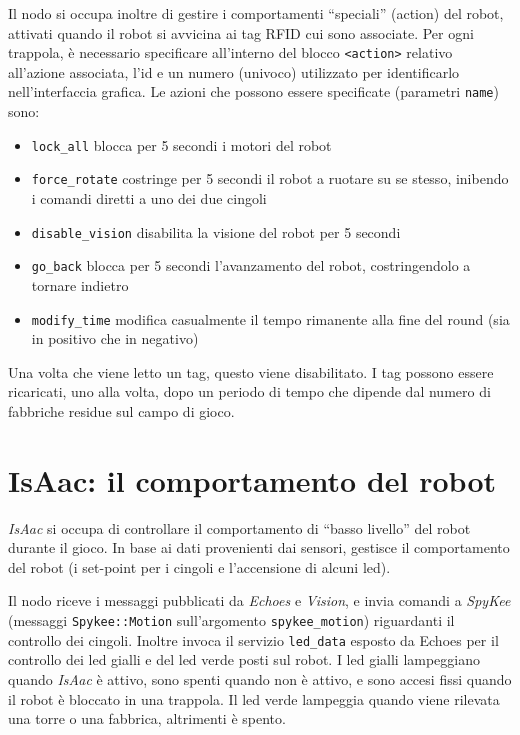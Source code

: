 Il nodo si occupa inoltre di gestire i comportamenti ``speciali'' (action) del robot, attivati quando il robot si avvicina ai tag RFID cui sono associate. Per ogni trappola, è necessario specificare all'interno del blocco \lstinline|<action>| relativo all'azione associata, l'id e un numero (univoco) utilizzato per identificarlo nell'interfaccia grafica. Le azioni che possono essere specificate (parametri \lstinline|name|) sono:
\begin{itemize}
\item \lstinline|lock_all| blocca per 5 secondi i motori del robot
\item \lstinline|force_rotate| costringe per 5 secondi il robot a ruotare su se stesso, inibendo i comandi diretti a uno dei due cingoli
\item \lstinline|disable_vision| disabilita la visione del robot per 5 secondi
\item \lstinline|go_back| blocca per 5 secondi l'avanzamento del robot, costringendolo a tornare indietro
\item \lstinline|modify_time| modifica casualmente il tempo rimanente alla fine del round (sia in positivo che in negativo)
\end{itemize}
Una volta che viene letto un tag, questo viene disabilitato. I tag possono essere ricaricati, uno alla volta, dopo un periodo di tempo che dipende dal numero di fabbriche residue sul campo di gioco. %

\section{IsAac: il comportamento del robot}
\emph{IsAac} si occupa di controllare il comportamento di ``basso livello'' del robot durante il gioco. In base ai dati provenienti dai sensori, gestisce il comportamento del robot (i set-point per i cingoli e l'accensione di alcuni led).

Il nodo riceve i messaggi pubblicati da \emph{Echoes} e \emph{Vision}, e invia comandi a \emph{SpyKee} (messaggi \verb|Spykee::Motion| sull'argomento \verb|spykee_motion|) riguardanti il controllo dei cingoli. Inoltre invoca il servizio \verb|led_data| esposto da Echoes per il controllo dei led gialli e del led verde posti sul robot. I led gialli lampeggiano quando \emph{IsAac} è attivo, sono spenti quando non è attivo, e sono accesi fissi quando il robot è bloccato in una trappola. Il led verde lampeggia quando viene rilevata una torre o una fabbrica, altrimenti è spento.

